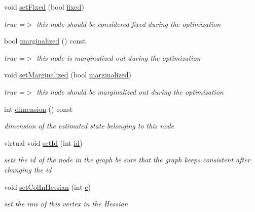 \begin{DoxyCompactItemize}
void \hyperlink{classg2o_1_1OptimizableGraph_1_1Vertex_af92ef49e1bcd6a8166afa151d367b905}{set\+Fixed} (bool \hyperlink{classg2o_1_1OptimizableGraph_1_1Vertex_ac83c34e6176f0cc5315ad7401a49efb3}{fixed})
\begin{DoxyCompactList}\small\item\em true =$>$ this node should be considered fixed during the optimization \end{DoxyCompactList}\item 
bool \hyperlink{classg2o_1_1OptimizableGraph_1_1Vertex_a214c01f0b3cab575f3496be729f6ccb1}{marginalized} () const 
\begin{DoxyCompactList}\small\item\em true =$>$ this node is marginalized out during the optimization \end{DoxyCompactList}\item 
void \hyperlink{classg2o_1_1OptimizableGraph_1_1Vertex_afabf1782886c78bf7b312bb1f2c90524}{set\+Marginalized} (bool \hyperlink{classg2o_1_1OptimizableGraph_1_1Vertex_a214c01f0b3cab575f3496be729f6ccb1}{marginalized})
\begin{DoxyCompactList}\small\item\em true =$>$ this node should be marginalized out during the optimization \end{DoxyCompactList}\item 
int \hyperlink{classg2o_1_1OptimizableGraph_1_1Vertex_a1037b978fec531eaf860d0037b992079}{dimension} () const 
\begin{DoxyCompactList}\small\item\em dimension of the estimated state belonging to this node \end{DoxyCompactList}\item 
virtual void \hyperlink{classg2o_1_1OptimizableGraph_1_1Vertex_ac57651173d6ce4bb4eebf8cb1d917551}{set\+Id} (int \hyperlink{classg2o_1_1HyperGraph_1_1Vertex_ad76b71c368b71971ac5affb5d57183d3}{id})
\begin{DoxyCompactList}\small\item\em sets the id of the node in the graph be sure that the graph keeps consistent after changing the id \end{DoxyCompactList}\item 
void \hyperlink{classg2o_1_1OptimizableGraph_1_1Vertex_aa605891d46b99ed97accf659f10bc8d5}{set\+Col\+In\+Hessian} (int \hyperlink{sparse__helper_8cpp_a4e1e0e72dd773439e333c84dd762a9c3}{c})
\begin{DoxyCompactList}\small\item\em set the row of this vertex in the Hessian \end{DoxyCompactList}\item 

\end{DoxyCompactItemize}
